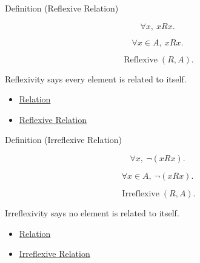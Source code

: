\begin{definitionbox}{Definition (Reflexive Relation)}
\begin{definition}
\label{def:reflexive-relation}
\[
\forall x,\ xRx.
\]
\end{definition}
\end{definitionbox}

\begin{remark*}
\[
\forall x\in A,\ xRx.
\]
\end{remark*}

\begin{remark*}
\[
\operatorname{Reflexive}(R,A).
\]
\end{remark*}

\begin{remark*}[Interpretation]
Reflexivity says every element is related to itself.
\end{remark*}

\begin{dependencies}
\begin{itemize}
  \item \hyperref[def:relation]{Relation}
  \item \hyperref[def:reflexive]{Reflexive Relation}
\end{itemize}
\end{dependencies}

\begin{definitionbox}{Definition (Irreflexive Relation)}
\begin{definition}
\label{def:irreflexive-relation}
\[
\forall x,\ \neg(xRx).
\]
\end{definition}
\end{definitionbox}

\begin{remark*}
\[
\forall x\in A,\ \neg(xRx).
\]
\end{remark*}

\begin{remark*}
\[
\operatorname{Irreflexive}(R,A).
\]
\end{remark*}

\begin{remark*}[Interpretation]
Irreflexivity says no element is related to itself.
\end{remark*}

\begin{dependencies}
\begin{itemize}
  \item \hyperref[def:relation]{Relation}
  \item \hyperref[def:irreflexive]{Irreflexive Relation}
\end{itemize}
\end{dependencies}

